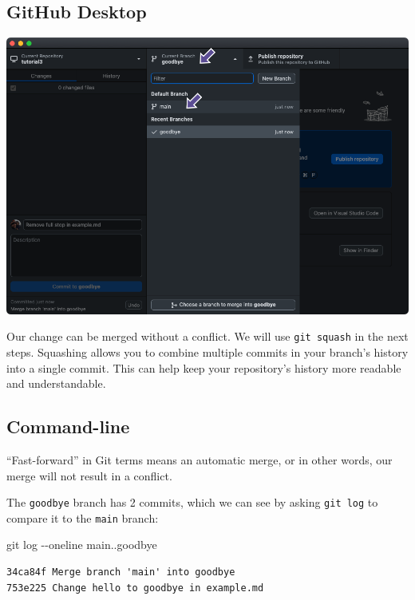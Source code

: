 \documentclass[
  letterpaper,
  DIV=11,
  numbers=noendperiod]{scrartcl}
\newenvironment{Shaded}{\begin{snugshade}}{\end{snugshade}}
\newcommand{\AttributeTok}[1]{\textcolor[rgb]{0.40,0.45,0.13}{#1}}
\newcommand{\FunctionTok}[1]{\textcolor[rgb]{0.28,0.35,0.67}{#1}}
\newcommand{\NormalTok}[1]{\textcolor[rgb]{0.00,0.23,0.31}{#1}}
\begin{document}
\subsection{GitHub Desktop}

\includegraphics{images/image69.png}

Our change can be merged without a conflict. We will use
\texttt{git\ squash} in the next steps. Squashing allows you to combine
multiple commits in your branch's history into a single commit. This can
help keep your repository's history more readable and understandable.

\subsection{Command-line}

``Fast-forward'' in Git terms means an automatic merge, or in other
words, our merge will not result in a conflict.

The \texttt{goodbye} branch has 2 commits, which we can see by asking
\texttt{git\ log} to compare it to the \texttt{main} branch:

\begin{Shaded}
\begin{Highlighting}[]
\FunctionTok{git}\NormalTok{ log }\AttributeTok{{-}{-}oneline}\NormalTok{ main..goodbye}
\end{Highlighting}
\end{Shaded}

\begin{verbatim}
34ca84f Merge branch 'main' into goodbye
753e225 Change hello to goodbye in example.md
\end{verbatim}
\end{document}
